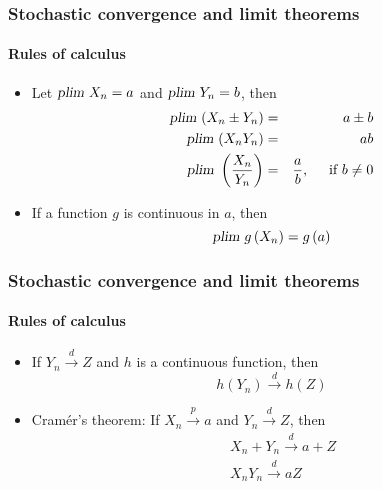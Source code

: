 \documentclass[notes=show]{beamer}
\begin{document}
\begin{frame}\frametitle{Stochastic convergence and limit theorems}\framesubtitle{Rules of calculus}
\begin{itemize}
    \item Let $\textsl{plim}~X_{n}=a$ and $\textsl{plim}~Y_{n}=b$, then
        \begin{eqnarray*}
            \textsl{plim}~(X_{n}\pm Y_{n}) &=&a\pm b \\
            \textsl{plim}~(X_{n}Y_{n}) &=&ab \\
            \textsl{plim}~\left( \frac{X_{n}}{Y_{n}}\right) &=&\frac{a}{b},\hspace{5mm} \text{if }b\neq 0
            \end{eqnarray*}
    \item If a function $g$ is continuous in $a$, then
        \begin{equation*}
            \textsl{plim}~g\left( X_{n}\right) =g\left( a\right)
        \end{equation*}
\end{itemize}
\end{frame}


\begin{frame}\frametitle{Stochastic convergence and limit theorems}\framesubtitle{Rules of calculus}
\begin{itemize}
    \item If $Y_{n}\overset{d}{\rightarrow }Z$ and $h$ is a continuous function, then
        \begin{equation*}
            h\left( Y_{n}\right) \overset{d}{\rightarrow }h\left( Z\right)
        \end{equation*}
    \item Cram\'{e}r's theorem: If $X_{n}\overset{p}{\rightarrow }a$ and $Y_{n}\overset{d}{\rightarrow }Z$, then
        \begin{eqnarray*}
            &&X_{n}+Y_{n}\overset{d}{\rightarrow }a+Z \\
            &&X_{n}Y_{n}\overset{d}{\rightarrow }aZ
        \end{eqnarray*}
\end{itemize}
\end{frame}
\end{document}
